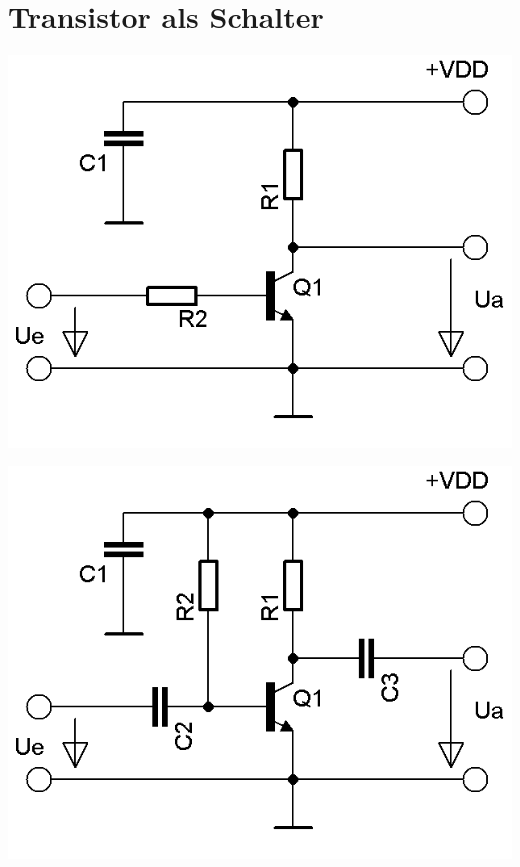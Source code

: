 \section*{Transistor als Schalter}
\begin{frame}
	\begin{minipage}{0.4\textwidth}
		\begin{center}
			\includegraphics[scale=0.8]{a06/Transistor-Schalter.png}\\
		\end{center}	
	\end{minipage}
	\hspace{3mm}
	\begin{minipage}{0.4\textwidth}
		\begin{center}
			\includegraphics[scale=0.8]{a06/Transistor-Verstaerker.png}\\

\end{center}
\end{minipage}
\end{frame}

